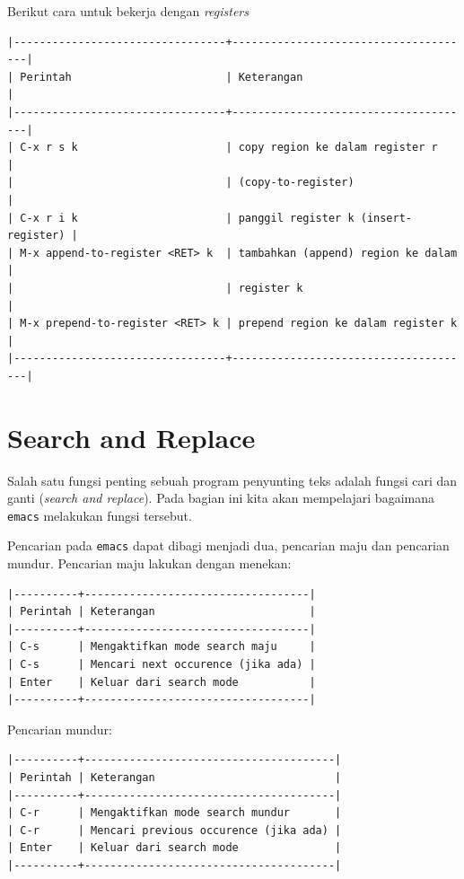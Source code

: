 \documentclass{article}
\begin{document}
Berikut cara untuk bekerja dengan \emph{registers}

\begin{verbatim}
|---------------------------------+--------------------------------------|
| Perintah                        | Keterangan                           |
|---------------------------------+--------------------------------------|
| C-x r s k                       | copy region ke dalam register r      |
|                                 | (copy-to-register)                   |
| C-x r i k                       | panggil register k (insert-register) |
| M-x append-to-register <RET> k  | tambahkan (append) region ke dalam   |
|                                 | register k                           |
| M-x prepend-to-register <RET> k | prepend region ke dalam register k   |
|---------------------------------+--------------------------------------|
\end{verbatim}

\section{Search and Replace}
Salah satu fungsi penting sebuah program penyunting teks adalah fungsi cari
dan ganti (\emph{search and replace}). Pada bagian ini kita akan mempelajari
bagaimana \verb=emacs= melakukan fungsi tersebut.

Pencarian pada \verb=emacs= dapat dibagi menjadi dua, pencarian maju dan 
pencarian mundur. Pencarian maju lakukan dengan menekan:

\begin{verbatim}
|----------+-----------------------------------|
| Perintah | Keterangan                        |
|----------+-----------------------------------|
| C-s      | Mengaktifkan mode search maju     |
| C-s      | Mencari next occurence (jika ada) |
| Enter    | Keluar dari search mode           |
|----------+-----------------------------------|
\end{verbatim}

Pencarian mundur:

\begin{verbatim}
|----------+---------------------------------------|
| Perintah | Keterangan                            |
|----------+---------------------------------------|
| C-r      | Mengaktifkan mode search mundur       |
| C-r      | Mencari previous occurence (jika ada) |
| Enter    | Keluar dari search mode               |
|----------+---------------------------------------|
\end{verbatim}
\end{document}
